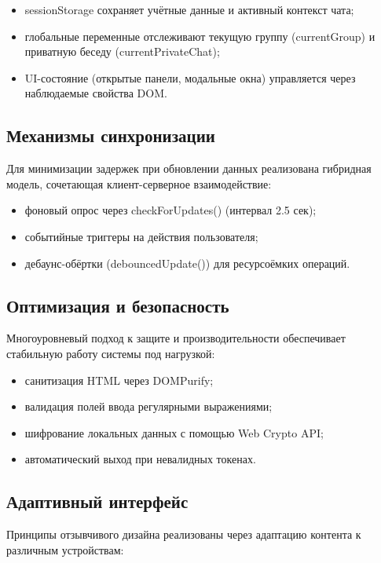 \begin{itemize}  
	\item sessionStorage сохраняет учётные данные и активный контекст чата;  
	\item глобальные переменные отслеживают текущую группу (currentGroup) и приватную беседу (currentPrivateChat);  
	\item UI-состояние (открытые панели, модальные окна) управляется через наблюдаемые свойства DOM.  
\end{itemize}  

\subsection{Механизмы синхронизации}  
Для минимизации задержек при обновлении данных реализована гибридная модель, сочетающая клиент-серверное взаимодействие:  

\begin{itemize}  
	\item фоновый опрос через checkForUpdates() (интервал 2.5 сек);  
	\item событийные триггеры на действия пользователя;  
	\item дебаунс-обёртки (debouncedUpdate()) для ресурсоёмких операций.  
\end{itemize}  

\subsection{Оптимизация и безопасность}  
Многоуровневый подход к защите и производительности обеспечивает стабильную работу системы под нагрузкой:  

\begin{itemize}  
	\item санитизация HTML через DOMPurify;  
	\item валидация полей ввода регулярными выражениями;  
	\item шифрование локальных данных с помощью Web Crypto API;  
	\item автоматический выход при невалидных токенах.  
\end{itemize}  

\subsection{Адаптивный интерфейс}  
Принципы отзывчивого дизайна реализованы через адаптацию контента к различным устройствам:  

